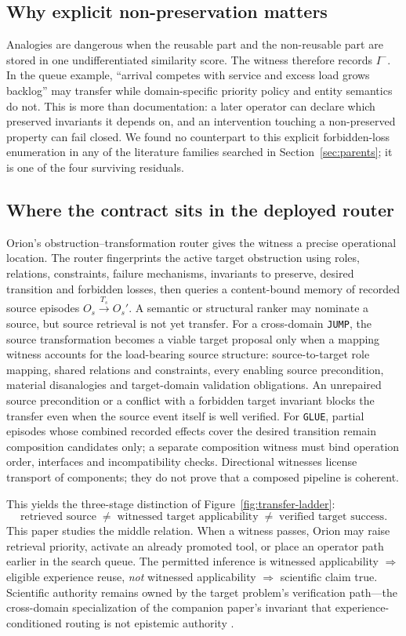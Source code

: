 \subsection{Why explicit non-preservation matters}

Analogies are dangerous when the reusable part and the non-reusable part are stored in one undifferentiated similarity score. The witness therefore records $I^-$. In the queue example, ``arrival competes with service and excess load grows backlog'' may transfer while domain-specific priority policy and entity semantics do not. This is more than documentation: a later operator can declare which preserved invariants it depends on, and an intervention touching a non-preserved property can fail closed. We found no counterpart to this explicit forbidden-loss enumeration in any of the literature families searched in Section~\ref{sec:parents}; it is one of the four surviving residuals.

\subsection{Where the contract sits in the deployed router}

Orion's obstruction--transformation router gives the witness a precise operational location. The router fingerprints the active target obstruction using roles, relations, constraints, failure mechanisms, invariants to preserve, desired transition and forbidden losses, then queries a content-bound memory of recorded source episodes $O_s\xrightarrow{T_s}O_s'$. A semantic or structural ranker may nominate a source, but source retrieval is not yet transfer. For a cross-domain \texttt{JUMP}, the source transformation becomes a viable target proposal only when a mapping witness accounts for the load-bearing source structure: source-to-target role mapping, shared relations and constraints, every enabling source precondition, material disanalogies and target-domain validation obligations. An unrepaired source precondition or a conflict with a forbidden target invariant blocks the transfer even when the source event itself is well verified. For \texttt{GLUE}, partial episodes whose combined recorded effects cover the desired transition remain composition candidates only; a separate composition witness must bind operation order, interfaces and incompatibility checks. Directional witnesses license transport of components; they do not prove that a composed pipeline is coherent.

This yields the three-stage distinction of Figure~\ref{fig:transfer-ladder}:
\[
\text{retrieved source}
\;\neq\;
\text{witnessed target applicability}
\;\neq\;
\text{verified target success}.
\]
This paper studies the middle relation. When a witness passes, Orion may raise retrieval priority, activate an already promoted tool, or place an operator path earlier in the search queue. The permitted inference is witnessed applicability $\Rightarrow$ eligible experience reuse, \emph{not} witnessed applicability $\Rightarrow$ scientific claim true. Scientific authority remains owned by the target problem's verification path---the cross-domain specialization of the companion paper's invariant that experience-conditioned routing is not epistemic authority \cite{yiu2026epistemic}.

